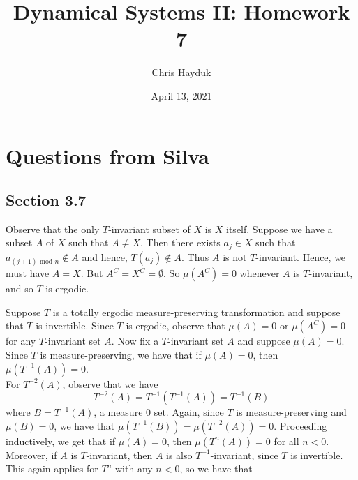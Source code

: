 \documentclass[12pt]{article}
\newenvironment{problem}[2][Problem]{\begin{trivlist}
\item[\hskip \labelsep {\bfseries #1}\hskip \labelsep {\bfseries #2.}]}{\end{trivlist}}
\begin{document}
\title{Dynamical Systems II: Homework 7}

\author{Chris Hayduk}
\date{April 13, 2021}

\maketitle

\section{Questions from Silva}

\subsection{Section 3.7}

\begin{problem}{2}
\end{problem}

Observe that the only $T$-invariant subset of $X$ is $X$ itself. Suppose we have a subset $A$ of $X$ such that $A \neq X$. Then there exists $a_j \in X$ such that $a_{(j+1) \text{ mod } n} \not\in A$ and hence, $T(a_j) \not\in A$. Thus $A$ is not $T$-invariant. Hence, we must have $A = X$. But $A^C = X^C = \emptyset$. So $\mu(A^C) = 0$ whenever $A$ is $T$-invariant, and so $T$ is ergodic.

\begin{problem}{3}
\end{problem}

Suppose $T$ is a totally ergodic measure-preserving transformation and suppose that $T$ is invertible. Since $T$ is ergodic, observe that $\mu(A) = 0$ or $\mu(A^C) = 0$ for any $T$-invariant set $A$. Now fix a $T$-invariant set $A$ and suppose $\mu(A) = 0$. Since $T$ is measure-preserving, we have that if $\mu(A) = 0$, then $\mu(T^{-1}(A)) = 0$.\\

For $T^{-2}(A)$, observe that we have $$T^{-2}(A) = T^{-1}(T^{-1}(A)) = T^{-1}(B)$$ where $B = T^{-1}(A)$, a measure $0$ set. Again, since $T$ is measure-preserving and $\mu(B) = 0$, we have that $\mu(T^{-1}(B)) = \mu(T^{-2}(A)) = 0$. Proceeding inductively, we get that if $\mu(A) = 0$, then $\mu(T^{n}(A)) = 0$ for all $n < 0$. Moreover, if $A$ is $T$-invariant, then $A$ is also $T^{-1}$-invariant, since $T$ is invertible. This again applies for $T^n$ with any $n < 0$, so we have that

\begin{problem}{6}
\end{problem}
\end{document}
